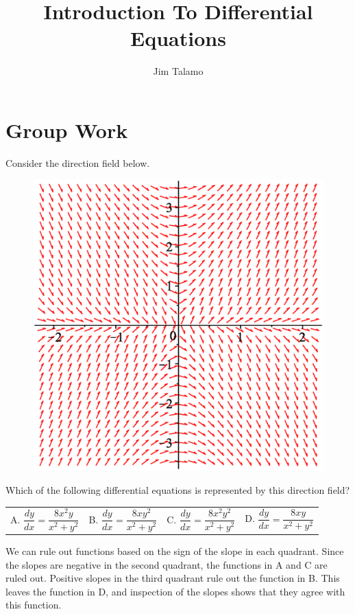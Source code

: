 \documentclass[]{ximera}
\author{Jim Talamo}
\title{Introduction To Differential Equations}
\begin{document}
\begin{abstract}
\end{abstract}
\maketitle

\vspace{-0.9in}

\section{Group Work}

\begin{problem} 

Consider the direction field below. 

 \begin{figure}[h!]
 \centering
  \includegraphics[width=.4 \textwidth]{DirectionField1.eps}
\end{figure}

Which of the following differential equations is represented by this direction field? 

\begin{tabular}{llll}

A. $\dfrac{dy}{dx} = \dfrac{8x^2y}{x^2+y^2}$ \qquad & B. $\dfrac{dy}{dx} = \dfrac{8xy^2}{x^2+y^2}$\qquad & C. $\dfrac{dy}{dx} = \dfrac{8x^2y^2}{x^2+y^2}$\qquad & D. $\dfrac{dy}{dx} = \dfrac{8xy}{x^2+y^2}$ 
\end{tabular}

\begin{solution}
We can rule out functions based on the sign of the slope in each quadrant. Since the slopes are negative in the second quadrant, the functions in A and C are ruled out. Positive slopes in the third quadrant rule out the function in B. This leaves the function in D, and inspection of the slopes shows that they agree with this function.
\end{solution}
\end{problem}
\end{document}
